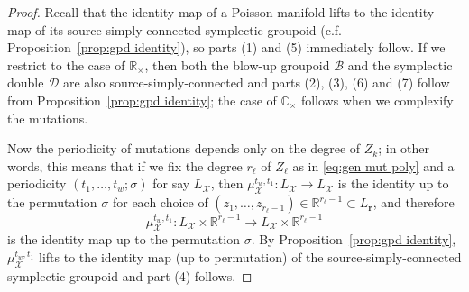 \documentclass{amsart}
\numberwithin{equation}{section}
\newcommand{\bfr}{{\boldsymbol{r}}}
\newcommand{\cB}{\mathcal{B}}
\newcommand{\cD}{\mathcal{D}}
\newcommand{\cX}{\mathcal{X}}
\newcommand{\CC}{\mathbb{C}}
\newcommand{\RR}{\mathbb{R}}
\begin{document}
\begin{proof}
Recall that the identity map of a Poisson manifold lifts to the identity map of its source-simply-connected symplectic groupoid (c.f. Proposition~\ref{prop:gpd identity}), so parts (1) and (5) immediately follow.
If we restrict to the case of $\RR_\times$, then both the blow-up groupoid $\cB$ and the symplectic double $\cD$ are also source-simply-connected and parts (2), (3), (6) and (7) follow from Proposition~\ref{prop:gpd identity}; the case of $\CC_\times$ follows when we complexify the mutations. 

Now the periodicity of mutations depends only on the degree of $Z_k$; in other words, this means that if we fix the degree $r_\ell$ of $Z_\ell$ as in \eqref{eq:gen mut poly} and a periodicity $(t_1,\ldots,t_w;\sigma)$ for say $L_\cX$, then $\mu_\cX^{t_w,t_1}: L_{\cX} \to L_{\cX}$ is the identity up to the permutation $\sigma$ for each choice of $(z_1, \ldots, z_{r_\ell-1}) \in \RR^{r_\ell - 1} \subset L_\bfr$, and therefore
\[
	\mu_\cX^{t_w,t_1}: L_\cX \times \RR^{r_\ell - 1} \to L_\cX \times \RR^{r_\ell - 1}
\]
is the identity map up to the permutation $\sigma$. By Proposition~\ref{prop:gpd identity}, $\mu_\cX^{t_w,t_1}$ lifts to the identity map (up to permutation) of the source-simply-connected symplectic groupoid and part (4) follows.

\end{proof}
\end{document}

